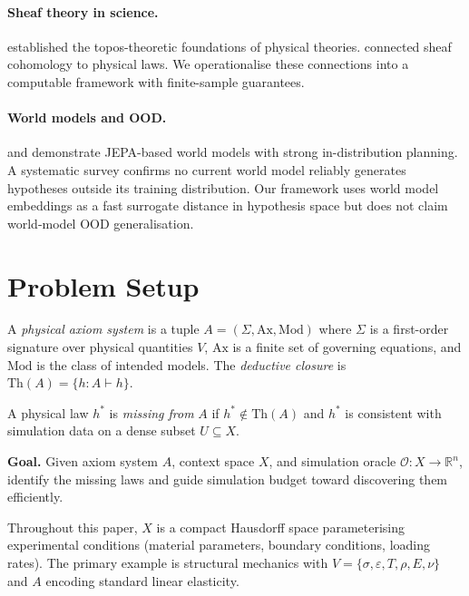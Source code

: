 \documentclass[twoside,11pt]{article}
\newcommand{\OA}{\mathcal{O}}
\newcommand{\Th}{\mathrm{Th}}
\begin{document}
\paragraph{Sheaf theory in science.}
\citet{lawvere1969adjointness} established the topos-theoretic
foundations of physical theories. \citet{baez2011physics} connected
sheaf cohomology to physical laws. We operationalise these connections
into a computable framework with finite-sample guarantees.

\paragraph{World models and OOD.}
\citet{lecun2022path} and \citet{maes2026lewm} demonstrate JEPA-based
world models with strong in-distribution planning. A systematic survey
\citep{consensus2025survey} confirms no current world model reliably
generates hypotheses outside its training distribution. Our framework
uses world model embeddings as a fast surrogate distance in hypothesis
space but does not claim world-model OOD generalisation.

\section{Problem Setup}
\label{sec:setup}

\begin{definition}
\label{def:axiom}
A \emph{physical axiom system} is a tuple
$A = (\Sigma, \mathrm{Ax}, \mathrm{Mod})$ where $\Sigma$ is a
first-order signature over physical quantities $V$, $\mathrm{Ax}$ is a
finite set of governing equations, and $\mathrm{Mod}$ is the class of
intended models. The \emph{deductive closure} is
$\Th(A) = \{h : A \vdash h\}$.
\end{definition}

\begin{definition}
\label{def:missing}
A physical law $h^*$ is \emph{missing from} $A$ if
$h^* \notin \Th(A)$ and $h^*$ is consistent with simulation data on
a dense subset $U \subseteq X$.
\end{definition}

\noindent
\textbf{Goal.} Given axiom system $A$, context space $X$, and
simulation oracle $\OA : X \to \mathbb{R}^n$, identify the missing
laws and guide simulation budget toward discovering them efficiently.

Throughout this paper, $X$ is a compact Hausdorff space
parameterising experimental conditions (material parameters, boundary
conditions, loading rates). The primary example is structural
mechanics with $V = \{\sigma, \varepsilon, T, \rho, E, \nu\}$ and
$A$ encoding standard linear elasticity.
\end{document}
